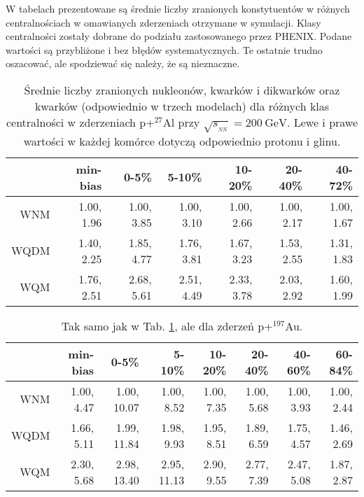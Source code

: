 \documentclass[a4paper,12pt]{article}
\begin{document}
W tabelach  prezentowane są średnie liczby zranionych konstytuentów w różnych centralnościach w omawianych zderzeniach otrzymane w symulacji. Klasy centralności zostały dobrane do podziału zastosowanego przez PHENIX. Podane wartości są przybliżone i bez błędów systematycznych. Te ostatnie trudno oszacować, ale spodziewać się należy, że są nieznaczne. 

\begin{table}[H]\centering
\begin{tabular}{|r|r|r|r|r|r|r|} \hline
 & min-bias & 0-5\% & 5-10\% & 10-20\% & 20-40\% & 40-72\% \\ \hline
WNM  & 1.00, 1.96 & 1.00, 3.85 & 1.00, 3.10 & 1.00, 2.66 & 1.00, 2.17 & 1.00, 1.67 \\ \hline
WQDM & 1.40, 2.25 & 1.85, 4.77 & 1.76, 3.81 & 1.67, 3.23 & 1.53, 2.55 & 1.31, 1.83 \\ \hline
WQM  & 1.76, 2.51 & 2.68, 5.61 & 2.51, 4.49 & 2.33, 3.78 & 2.03, 2.92 & 1.60, 1.99 \\ \hline
\end{tabular}
\caption{Średnie liczby zranionych nukleonów, kwarków i dikwarków oraz kwarków (odpowiednio w trzech modelach) dla różnych klas centralności w zderzeniach p+$^{27}$Al przy $\sqrt{s_{_{NN}}} = 200~\text{GeV}$. Lewe i prawe wartości w każdej komórce dotyczą odpowiednio protonu i glinu.}\label{table:p-Al}
\end{table}
\begin{table}[H]\centering
\begin{tabular}{|r|r|r|r|r|r|r|r|} \hline
 & min-bias & 0-5\% & 5-10\% & 10-20\% & 20-40\% & 40-60\% & 60-84\% \\ \hline
WNM  & 1.00, 4.47 & 1.00, 10.07 & 1.00, 8.52 & 1.00, 7.35 & 1.00, 5.68 & 1.00, 3.93 & 1.00, 2.44 \\ \hline
WQDM & 1.66, 5.11 & 1.99, 11.84 & 1.98, 9.93 & 1.95, 8.51 & 1.89, 6.59 & 1.75, 4.57 & 1.46, 2.69 \\ \hline
WQM  & 2.30, 5.68 & 2.98, 13.40 & 2.95, 11.13 & 2.90, 9.55 & 2.77, 7.39 & 2.47, 5.08 & 1.87, 2.87 \\ \hline
\end{tabular}
\caption{Tak samo jak w Tab. \ref{table:p-Al}, ale dla zderzeń p+$^{197}$Au.}\label{table:p-Au}
\end{table}
\end{document}
